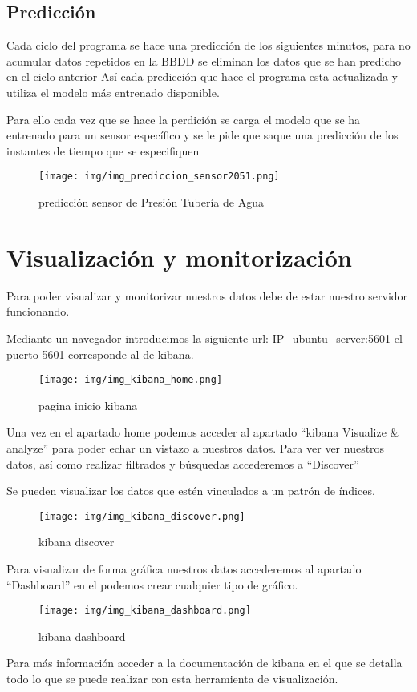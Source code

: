 \subsection{Predicción}

Cada ciclo del programa se hace una predicción de los siguientes minutos, para no acumular datos repetidos en la BBDD se eliminan los datos que se han predicho en el ciclo anterior Así cada predicción que hace el programa esta actualizada y utiliza el modelo más entrenado disponible.

Para ello cada vez que se hace la perdición se carga el modelo que se ha entrenado para un sensor específico y se le pide que saque una predicción de los instantes de tiempo que se especifiquen

\begin{figure}[h]
	\centering
	\texttt{[image: img/img\_prediccion\_sensor2051.png]}
	\caption{predicción sensor de Presión Tubería de Agua}
	\label{img_prediccion_sensor2051}
\end{figure}


\section{Visualización y monitorización}

Para poder visualizar y monitorizar nuestros datos debe de estar nuestro servidor funcionando.

Mediante un navegador introducimos la siguiente url: IP\_ubuntu\_server:5601 el puerto 5601 corresponde al de kibana.

\begin{figure}[h]
	\centering
	\texttt{[image: img/img\_kibana\_home.png]}
	\caption{pagina inicio kibana}
	\label{img_kibana_home}
\end{figure}

Una vez en el apartado home podemos acceder al apartado ``kibana Visualize & analyze'' para poder echar un vistazo a nuestros datos. Para ver ver nuestros datos, así como realizar filtrados y búsquedas accederemos a ``Discover''

Se pueden visualizar los datos que estén vinculados a un patrón de índices.

\begin{figure}[h]
	\centering
	\texttt{[image: img/img\_kibana\_discover.png]}
	\caption{kibana discover}
	\label{img_kibana_discover}
\end{figure}

Para visualizar de forma gráfica nuestros datos accederemos al apartado ``Dashboard'' en el podemos crear cualquier tipo de gráfico.

\begin{figure}[h]
	\centering
	\texttt{[image: img/img\_kibana\_dashboard.png]}
	\caption{kibana dashboard}
	\label{img_kibana_dashboard}
\end{figure}

Para más información acceder a la documentación de kibana en el que se detalla todo lo que se puede realizar con esta herramienta de visualización.


